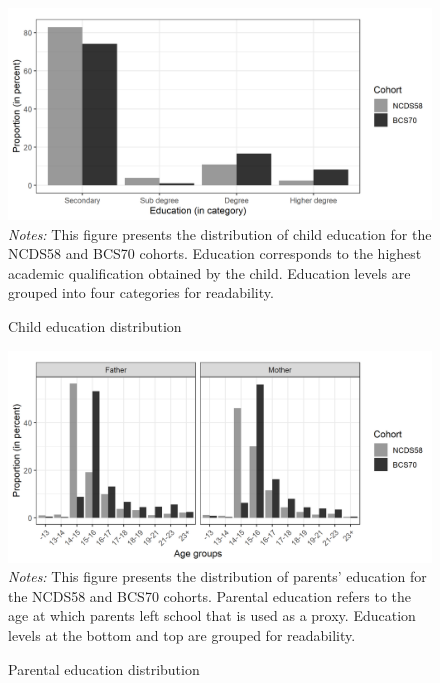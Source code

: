 \begin{figure}[!htb]
    \centering
    \caption{Child education distribution}
    \label{chap2-fig:stat-educ-child-short}
    \includegraphics[width=\linewidth]{chap2/graphic/stat-educ-child-short.png}
	\vspace{-3em}
	\justify\singlespacing\footnotesize{\textit{Notes:} This figure presents the distribution of child education for the NCDS58 and BCS70 cohorts. Education corresponds to the highest academic qualification obtained by the child. Education levels are grouped into four categories for readability.}
\end{figure}

\begin{figure}[!htb]
    \centering
    \caption{Parental education distribution}
    \label{chap2-fig:stat-educ-parents}
    \includegraphics[width=\linewidth]{chap2/graphic/stat-educ-parents.png}
	\vspace{-3em}
	\justify\singlespacing\footnotesize{\textit{Notes:} This figure presents the distribution of parents' education for the NCDS58 and BCS70 cohorts. Parental education refers to the age at which parents left school that is used as a proxy. Education levels at the bottom and top are grouped for readability.}
\end{figure}

